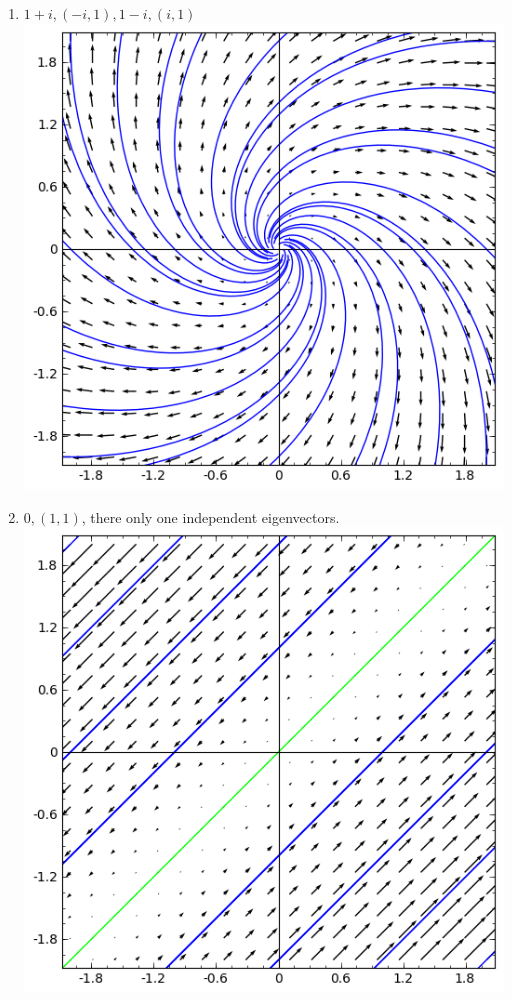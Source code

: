 {\begin{multicols}{2}
\begin{enumerate}
\begin{enumerate}
\item $1+i, (-i,1), 1-i, (i,1)$\\\includegraphics[width=\myvfwidth]{Applications/support/vfg}
\item $0, (1,1)$, there only one independent eigenvectors. \\\includegraphics[width=\myvfwidth]{Applications/support/vfh}

\end{enumerate}
\end{enumerate}
\end{multicols}}
